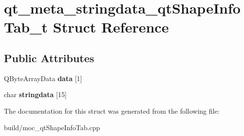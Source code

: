 \hypertarget{structqt__meta__stringdata__qt_shape_info_tab__t}{}\section{qt\+\_\+meta\+\_\+stringdata\+\_\+qt\+Shape\+Info\+Tab\+\_\+t Struct Reference}
\label{structqt__meta__stringdata__qt_shape_info_tab__t}
\subsection*{Public Attributes}
\begin{DoxyCompactItemize}
\item 
\hypertarget{structqt__meta__stringdata__qt_shape_info_tab__t_a1d18375d02d6eb10e69041fffa4c4e54}{}Q\+Byte\+Array\+Data {\bfseries data} \mbox{[}1\mbox{]}\label{structqt__meta__stringdata__qt_shape_info_tab__t_a1d18375d02d6eb10e69041fffa4c4e54}

\item 
\hypertarget{structqt__meta__stringdata__qt_shape_info_tab__t_ac87be8752a7abcf5e4e6ad7020b566d7}{}char {\bfseries stringdata} \mbox{[}15\mbox{]}\label{structqt__meta__stringdata__qt_shape_info_tab__t_ac87be8752a7abcf5e4e6ad7020b566d7}

\end{DoxyCompactItemize}


The documentation for this struct was generated from the following file\+:\begin{DoxyCompactItemize}
\item 
build/moc\+\_\+qt\+Shape\+Info\+Tab.\+cpp\end{DoxyCompactItemize}
